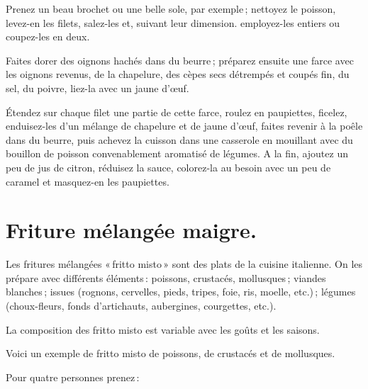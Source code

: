 
Prenez un beau brochet ou une belle sole, par exemple ; nettoyez le poisson,
levez-en les filets, salez-les et, suivant leur dimension. employez-les entiers
ou coupez-les en deux.

Faites dorer des oignons hachés dans du beurre ; préparez ensuite une farce avec
les oignons revenus, de la chapelure, des cèpes secs détrempés et coupés fin, du
sel, du poivre, liez-la avec un jaune d'œuf.

Étendez sur chaque filet une partie de cette farce, roulez en paupiettes,
ficelez, enduisez-les d'un mélange de chapelure et de jaune d'œuf, faites
revenir à la poêle dans du beurre, puis achevez la cuisson dans une casserole
en mouillant avec du bouillon de poisson convenablement aromatisé de légumes.
A la fin, ajoutez un peu de jus de citron, réduisez la sauce, colorez-la au
besoin avec un peu de caramel et masquez-en les paupiettes.

\section*{\centering Friture mélangée maigre.}
\label{pg0315} \hypertarget{p0315}{}

Les fritures mélangées « fritto misto » sont des plats de la cuisine italienne.
On les prépare avec différents éléments : poissons, crustacés, mollusques ;
viandes blanches ; issues (rognons, cervelles, pieds, tripes, foie, ris,
moelle, etc.) ; légumes (choux-fleurs, fonds d'artichauts, aubergines,
courgettes, etc.).

La composition des fritto misto est variable avec les goûts et les saisons.

Voici un exemple de fritto misto de poissons, de crustacés et de mollusques.

Pour quatre personnes prenez :

\medskip

